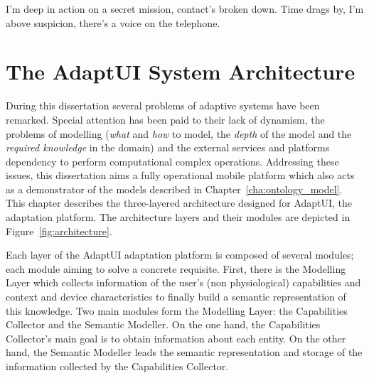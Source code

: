 
\begin{savequote}[50mm]
I'm deep in action on a secret mission, contact's broken down.
Time drags by, I'm above suspicion, there's a voice on the telephone.

\end{savequote}


\chapter{The AdaptUI System Architecture}
\label{cha:architecture}

\ifpdf
    \graphicspath{{4_system_architecture/figures/PNG/}{4_system_architecture/figures/PDF/}{4_system_architecture/figures/}}
\else
    \graphicspath{{4_system_architecture/figures/EPS/}{4_system_architecture/figures/}}
\fi

During this dissertation several problems of adaptive systems have been remarked.
Special attention has been paid to their lack of dynamism, the problems of 
modelling (\textit{what} and \textit{how} to model, the \textit{depth} of the 
model and the \textit{required knowledge} in the domain) and the external 
services and platforms dependency to perform computational complex operations. 
Addressing these issues, this dissertation aims a fully operational mobile 
platform which also acts as a demonstrator of the models described in Chapter~\ref{cha:ontology_model}. 
This chapter describes the three-layered architecture designed for AdaptUI, the
adaptation platform. The architecture layers and their modules are depicted in 
Figure~\ref{fig:architecture}.

Each layer of the AdaptUI adaptation platform is composed of several modules;
each module aiming to solve a concrete requisite. First, there is the Modelling
Layer which collects information of the user's (non physiological) capabilities
and context and device characteristics to finally build a semantic representation
of this knowledge. Two main modules form the Modelling Layer: the Capabilities
Collector and the Semantic Modeller. On the one hand, the Capabilities Collector's
main goal is to obtain information about each entity. On the other hand, the Semantic
Modeller leads the semantic representation and storage of the information
collected by the Capabilities Collector.

